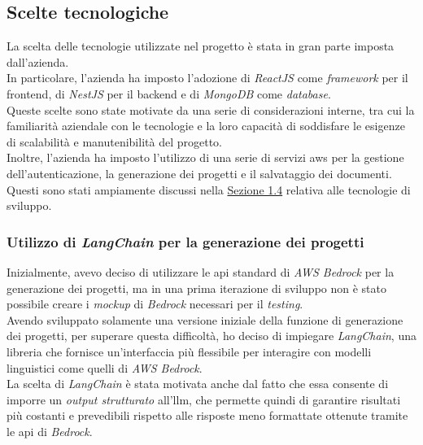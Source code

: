 \subsection{Scelte tecnologiche}
\label{subsec:scelte-tecnologiche}

La scelta delle tecnologie utilizzate nel progetto è stata in gran parte imposta dall'azienda.\\
In particolare, l'azienda ha imposto l'adozione di \textit{ReactJS} come \textit{framework} per il \gls{frontend}, di \textit{NestJS} per il \gls{backend} e di \textit{MongoDB} come \textit{database}.\\
Queste scelte sono state motivate da una serie di considerazioni interne, tra cui la familiarità aziendale con le tecnologie e la loro capacità di soddisfare le esigenze di scalabilità e manutenibilità del progetto.\\

\noindent Inoltre, l'azienda ha imposto l'utilizzo di una serie di servizi \gls{aws} per la gestione dell'autenticazione, la generazione dei progetti e il salvataggio dei documenti.\\
Questi sono stati ampiamente discussi nella {\hyperref[sez:tecnologie-sviluppo]{Sezione 1.4}} relativa alle tecnologie di sviluppo.

\subsubsection{Utilizzo di \textit{LangChain} per la generazione dei progetti}

Inizialmente, avevo deciso di utilizzare le \gls{api} standard di \textit{AWS Bedrock} per la generazione dei progetti, ma in una prima iterazione di sviluppo non è stato possibile creare i \textit{mockup} di \textit{Bedrock} necessari per il \textit{testing}.\\

\noindent Avendo sviluppato solamente una versione iniziale della funzione di generazione dei progetti, per superare questa difficoltà, ho deciso di impiegare \textit{LangChain}, una libreria che fornisce un'interfaccia più flessibile per interagire con modelli linguistici come quelli di \textit{AWS Bedrock}.\\

\noindent La scelta di \textit{LangChain} è stata motivata anche dal fatto che essa consente di imporre un \textit{output strutturato} all'\gls{llm}, che permette quindi di garantire risultati più costanti e prevedibili rispetto alle risposte meno formattate ottenute tramite le \gls{api} di \textit{Bedrock}.\\

